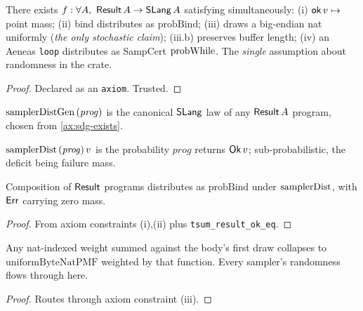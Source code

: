 \begin{theorem}\label{ax:sdg-exists}
  \leanok
  \statusAxiom{} There exists \(f : \forall A,\ \mathsf{Result}\,A \to \mathsf{SLang}\,A\)
  satisfying simultaneously: (i) \(\mathsf{ok}\,v \mapsto\) point mass; (ii) bind
  distributes as \(\mathrm{probBind}\); (iii) \fillbytes{} draws a big-endian nat
  uniformly (\emph{the only stochastic claim}); (iii.b) \fillbytes{} preserves
  buffer length; (iv) an Aeneas \texttt{loop} distributes as SampCert
  \(\mathrm{probWhile}\). The \emph{single} assumption about randomness in the crate.
\end{theorem}
\begin{proof}\leanok Declared as an \texttt{axiom}. Trusted. \end{proof}

\begin{definition}\label{def:samplerDistGen}
  \leanok
  \(\mathrm{samplerDistGen}\,(\mathit{prog})\) is the canonical \(\mathsf{SLang}\) law of any \(\mathsf{Result}\,A\)
  program, chosen from \ref{ax:sdg-exists}. \statusDone
\end{definition}

\begin{definition}\label{def:samplerDist}
  \leanok
  \(\mathrm{samplerDist}\,(\mathit{prog})\,v\) is the probability \(\mathit{prog}\) returns
  \(\mathsf{Ok}\,v\); sub-probabilistic, the deficit being failure mass. \statusDone
\end{definition}

\begin{lemma}\label{thm:samplerDist-bind}
  \leanok
  Composition of \(\mathsf{Result}\) programs distributes as \(\mathrm{probBind}\) under
  \(\mathrm{samplerDist}\), with \(\mathsf{Err}\) carrying zero mass. \statusDone
\end{lemma}
\begin{proof}\leanok
  From axiom constraints (i),(ii) plus \texttt{tsum\_result\_ok\_eq}.
\end{proof}

\begin{lemma}\label{thm:fill-bytes-bridge}
  \leanok
  Any nat-indexed weight summed against the body's first \fillbytes{} draw
  collapses to \(\mathrm{uniformByteNatPMF}\) weighted by that function. Every
  sampler's randomness flows through here. \statusDone
\end{lemma}
\begin{proof}\leanok Routes through axiom constraint (iii). \end{proof}


